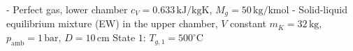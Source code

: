 - Perfect gas, lower chamber \( c_V = 0.633 \, \text{kJ/kgK} \), \( M_g = 50 \, \text{kg/kmol} \)  
- Solid-liquid equilibrium mixture (EW) in the upper chamber, \( V \) constant  
\( m_K = 32 \, \text{kg} \), \( p_{\text{amb}} = 1 \, \text{bar} \), \( D = 10 \, \text{cm} \)  
State \( 1 \): \( T_{g,1} = 500^\circ \text{C} \)